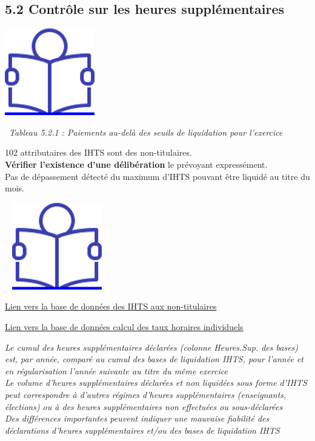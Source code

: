 \hypertarget{controle-sur-les-heures-supplementaires}{%
\subsection{5.2 Contrôle sur les heures
supplémentaires}\label{controle-sur-les-heures-supplementaires}}

\href{../Docs/Notices/fiche_IHTS.odt}{\includegraphics{icones/Notice.png}}

~\emph{Tableau 5.2.1 : Paiements au-delà des seuils de liquidation pour
l'exercice}

102 attributaires des IHTS sont des non-titulaires.\\
\textbf{Vérifier l'existence d'une délibération} le prévoyant
expressément.\\
Pas de dépassement détecté du maximum d'IHTS pouvant être liquidé au
titre du mois.

~
\href{../Docs/Notices/fiche_liquidation_IHTS.odt}{\includegraphics{icones/Notice.png}}

\href{../Bases/Reglementation/Base.IHTS.non.tit.csv}{Lien vers la base de
données des IHTS aux non-titulaires}

\href{../Bases/Reglementation/Taux.horaires.csv}{Lien vers la base de
données calcul des taux horaires individuels}

\emph{Le cumul des heures supplémentaires déclarées (colonne Heures.Sup.
des bases) est, par année, comparé au cumul des bases de liquidation
IHTS, pour l'année et en régularisation l'année suivante au titre du
même exercice}\\
\emph{Le volume d'heures supplémentaires déclarées et non liquidées sous
forme d'IHTS peut correspondre à d'autres régimes d'heures
supplémentaires (enseignants, élections) ou à des heures supplémentaires
non effectuées ou sous-déclarées}\\
\emph{Des différences importantes peuvent indiquer une mauvaise
fiabilité des déclarations d'heures supplémentaires et/ou des bases de
liquidation IHTS}

